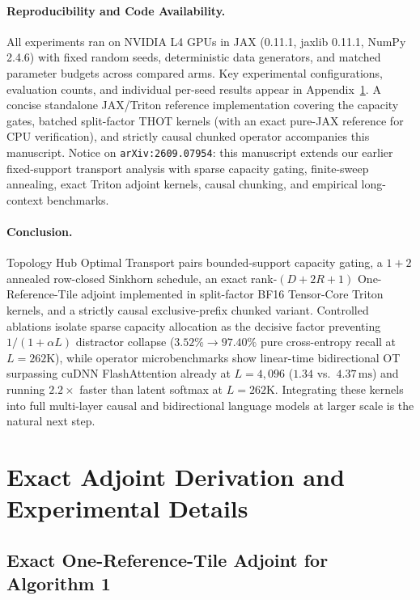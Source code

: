 \documentclass[11pt]{article}
\begin{document}
\paragraph{Reproducibility and Code Availability.}
All experiments ran on NVIDIA L4 GPUs in JAX (0.11.1, jaxlib 0.11.1, NumPy 2.4.6) with fixed random seeds, deterministic data generators, and matched parameter budgets across compared arms. Key experimental configurations, evaluation counts, and individual per-seed results appear in Appendix~\ref{app:details}. A concise standalone JAX/Triton reference implementation covering the capacity gates, batched split-factor THOT kernels (with an exact pure-JAX reference for CPU verification), and strictly causal chunked operator accompanies this manuscript. Notice on \texttt{arXiv:2609.07954}: this manuscript extends our earlier fixed-support transport analysis with sparse capacity gating, finite-sweep annealing, exact Triton adjoint kernels, causal chunking, and empirical long-context benchmarks.

\paragraph{Conclusion.}
Topology Hub Optimal Transport pairs bounded-support capacity gating, a $1+2$ annealed row-closed Sinkhorn schedule, an exact rank-$(D+2R+1)$ One-Reference-Tile adjoint implemented in split-factor BF16 Tensor-Core Triton kernels, and a strictly causal exclusive-prefix chunked variant. Controlled ablations isolate sparse capacity allocation as the decisive factor preventing $1/(1+\alpha L)$ distractor collapse ($3.52\% \to 97.40\%$ pure cross-entropy recall at $L=262\text{K}$), while operator microbenchmarks show linear-time bidirectional OT surpassing cuDNN FlashAttention already at $L=4{,}096$ ($1.34$ vs.\ $4.37\,\text{ms}$) and running $2.2\times$ faster than latent softmax at $L=262\text{K}$. Integrating these kernels into full multi-layer causal and bidirectional language models at larger scale is the natural next step.

\appendix
\section{Exact Adjoint Derivation and Experimental Details}
\label{app:details}

\subsection{Exact One-Reference-Tile Adjoint for Algorithm 1}
\label{app:adjoint}
\end{document}
